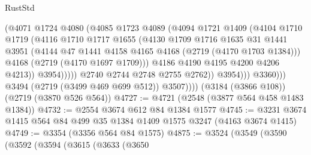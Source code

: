 \begin{lexlean}{RustStd}
\begin{coremodule}
                                (@4071
                                  @1724
                                  @4080
                                  (@4085
                                    @1723
                                    @4089
                                    (@4094
                                      @1721
                                      @1409
                                      (@4104
                                        @1710
                                        @1719
                                        (@4116
                                          @1710
                                          @1717
                                          @1655
                                          (@4130
                                            @1709
                                            @1716
                                            @1635
                                            @31
                                            @1441
                                            @3951
                                            (@4144
                                              @47
                                              @1441
                                              @4158
                                              @4165
                                              @4168
                                              (@2719 (@4170 @1703 @1384)))
                                            @4168
                                            (@2719 (@4170 @1697 @1709)))
                                          @4186
                                          @4190
                                          @4195
                                          @4200
                                          @4206
                                          @4213))
                                      @3954)))))
                            @2740
                            @2744
                            @2748
                            @2755
                            @2762))
                        @3954)))
                  @3360)))
            @3494
            (@2719 (@3499 @469 @699 @512))
            @3507))))
    (@3184 (@3866 @108))
    (@2719 (@3870 @526 @564))
@4727 := @4721 (@2548 (@3877 @564 @458 @1483 @1384))
@4732 := @2554 @3674 @612 @84 @1384 @1577
@4745 := @3231 @3674 @1415 @564 @84 @499 @35 @1384 @1409 @1575 @3247 (@4163 @3674 @1415)
@4749 := @3354 (@3356 @564 @84 @1575)
@4875 := @3524
    (@3549
      (@3590
        (@3592
          (@3594
            (@3615
              (@3633
                (@3650

\end{coremodule}
\end{lexlean}
